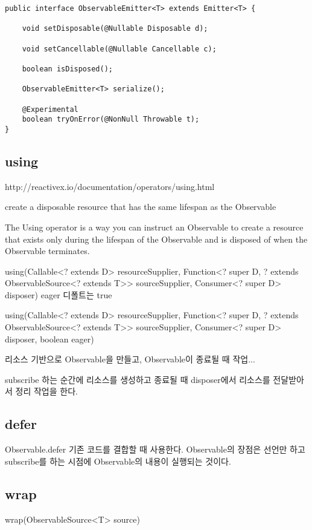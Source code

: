 \documentclass{book}
\begin{document}
\begin{verbatim}
public interface ObservableEmitter<T> extends Emitter<T> {

    void setDisposable(@Nullable Disposable d);

    void setCancellable(@Nullable Cancellable c);

    boolean isDisposed();

    ObservableEmitter<T> serialize();

    @Experimental
    boolean tryOnError(@NonNull Throwable t);
}
\end{verbatim}

\subsection{using}
http://reactivex.io/documentation/operators/using.html

create a disposable resource that has the same lifespan as the Observable

The Using operator is a way you can instruct an Observable to create a resource that exists only during the lifespan of the Observable and is disposed of when the Observable terminates.

using(Callable<? extends D> resourceSupplier, Function<? super D, ? extends ObservableSource<? extends T>> sourceSupplier, Consumer<? super D> disposer)
eager 디폴트는 true

using(Callable<? extends D> resourceSupplier, Function<? super D, ? extends ObservableSource<? extends T>> sourceSupplier, Consumer<? super D> disposer, boolean eager)

리소스 기반으로 Observable을 만들고, Observable이 종료될 때 작업...

subscribe 하는 순간에 리소스를 생성하고 종료될 때 disposer에서 리소스를 전달받아서 정리 작업을 한다.




\subsection{defer}
Observable.defer
기존 코드를 결합할 때 사용한다.
Observable의 장점은 선언만 하고 subscribe를 하는 시점에 Observable의 내용이 실행되는 것이다.



\subsection{wrap}
wrap(ObservableSource<T> source)
\end{document}
